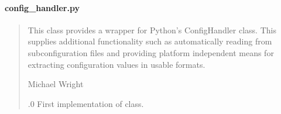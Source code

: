 \documentclass[letterpaper,10pt,english]{sphinxmanual}
\begin{document}
\paragraph{config\_handler.py}
\label{\detokenize{modules/input/config_handler:config-handler-py}}\begin{quote}\begin{description}
\sphinxAtStartPar
This class provides a wrapper for Python’s ConfigHandler class.
This supplies additional functionality such as automatically reading from
sub\sphinxhyphen{}configuration files and providing platform independent means for
extracting configuration values in usable formats.

\sphinxAtStartPar
Michael Wright \sphinxhyphen{} 

.0 \sphinxhyphen{} First implementation of class.

\end{description}\end{quote}
\end{document}
